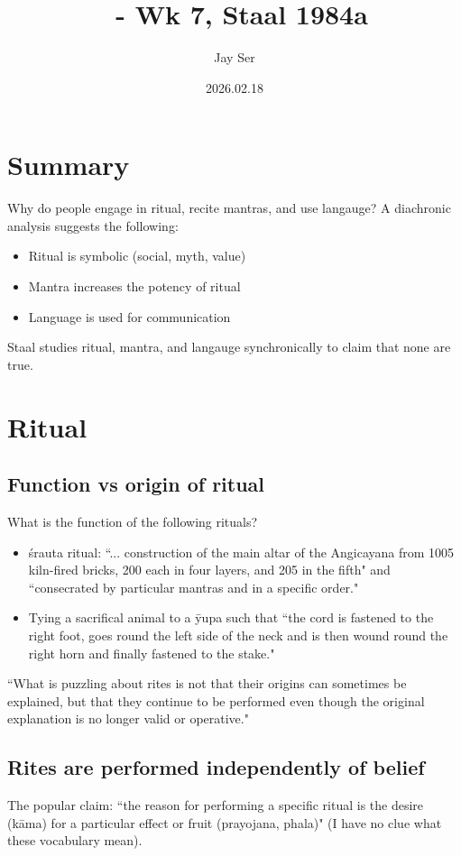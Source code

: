\documentclass[12pt]{article}
\title{\course\ - Wk 7, Staal 1984a}
\author{Jay Ser}
\date{2026.02.18}
\begin{document}
\maketitle
\thispagestyle{fancy}


\section*{Summary}
Why do people engage in ritual, recite mantras, and use langauge?
A diachronic analysis suggests the following: 
\begin{itemize} 
  \item Ritual is symbolic (social, myth, value) 
  \item Mantra increases the potency of ritual 
  \item Language is used for communication 
\end{itemize}
Staal studies ritual, mantra, and langauge synchronically to claim that none are true. 

\section*{Ritual}
\subsection*{Function vs origin of ritual}
What is the function of the following rituals? 
\begin{itemize}
  \item \'{s}rauta ritual: ``... construction of the main altar of the Angicayana from 1005 kiln-fired bricks, 200 each in four layers, and 205 in the fifth" 
    and ``consecrated by particular mantras and in a specific order." 
  \item Tying a sacrifical animal to a \={y}upa such that 
    ``the cord is fastened to the right foot, goes round the left side of the neck and is then wound round the right horn and finally fastened to the stake."
\end{itemize} 
``What is puzzling about rites is not that their origins can sometimes be explained, but that they continue to be performed even though the original explanation is no longer valid or operative."

\subsection*{Rites are performed independently of belief} 
The popular claim: ``the reason for performing a specific ritual is the desire (k\={a}ma) for a particular effect or fruit (prayojana, phala)"
(I have no clue what these vocabulary mean). 
\end{document}
